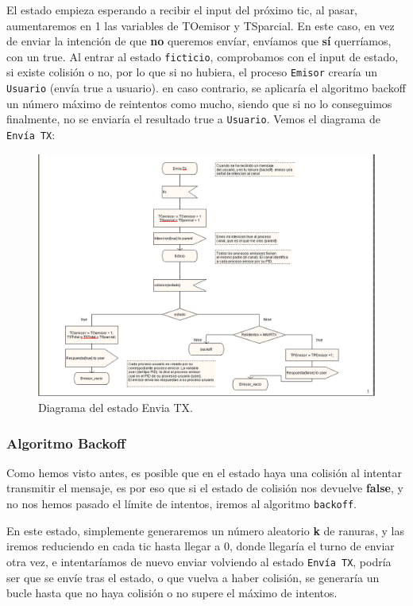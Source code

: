 \documentclass{article}
\begin{document}
El estado empieza esperando a recibir el input del próximo tic, al pasar, aumentaremos en 1 las variables de TOemisor y TSparcial. En este caso, en vez de enviar la intención de que \textbf{no} queremos envíar, envíamos que \textbf{sí} querríamos, con un true. Al entrar al estado \verb|ficticio|, comprobamos con el input de estado, si existe colisión o no, por lo que si no hubiera, el proceso \verb|Emisor| crearía un \verb|Usuario| (envía true a usuario). en caso contrario, se aplicaría el algoritmo backoff un número máximo de reintentos como mucho, siendo que si no lo conseguimos finalmente, no se enviaría el resultado true a \verb|Usuario|.
Vemos el diagrama de \verb|Envía TX|:

\quad

\begin{figure}[h]
    \centering
    \includegraphics[width=0.8\linewidth]{src/Estado enviatx.png}
    \caption{\label{fig:enviatxbl} Diagrama del estado Envia TX.}
\end{figure}



\subsubsection{Algoritmo Backoff}

Como hemos visto antes, es posible que en el estado haya una colisión al intentar transmitir el mensaje, es por eso que si el estado de colisión nos devuelve \textbf{false}, y no nos hemos pasado el límite de intentos, iremos al algoritmo \verb|backoff|.

En este estado, simplemente generaremos un número aleatorio \textbf{k} de ranuras, y las iremos reduciendo en cada tic hasta llegar a 0, donde llegaría el turno de enviar otra vez, e intentaríamos de nuevo enviar volviendo al estado \verb|Envía TX|, podría ser que se envíe tras el estado, o que vuelva a haber colisión, se generaría un bucle hasta que no haya colisión o no supere el máximo de intentos.
\newpage
\end{document}
